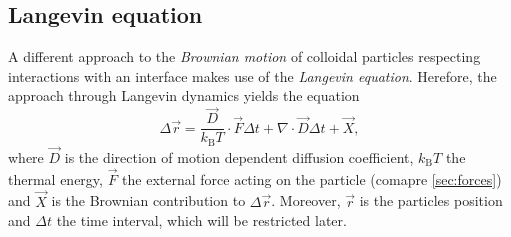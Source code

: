 \documentclass[.../bericht]{subfilies}
\begin{document}
        \subsection{Langevin equation}

          A different approach to the \textit{Brownian motion} of colloidal particles respecting interactions with an interface makes use of the \textit{Langevin equation}. Herefore, the approach through  Langevin dynamics yields the equation
          \begin{equation*}
            \Delta \vec{r}=\frac{\vec{D}}{k_\mathrm{B}T}\cdot \vec{F}\Delta t+ \nabla \cdot \vec{D}\Delta t + \vec{X},
          \end{equation*}
          where $\vec{D}$ is the direction of motion dependent diffusion coefficient, $k_\mathrm{B}T$ the thermal energy, $\vec{F}$ the external force acting on the particle (comapre \cref{sec:forces}) and $\vec{X}$ is the Brownian contribution to $\Delta \vec{r}$. Moreover, $\vec{r}$ is the particles position and $\Delta t$ the time interval, which will be restricted later.
\end{document}
